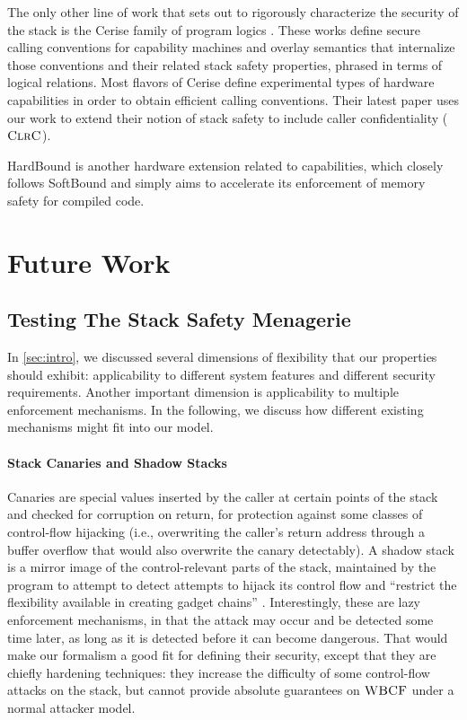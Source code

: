 \documentclass[10pt,conference]{ieeetran}%
\theoremstyle{definition}
\begin{document}
The only other line of work that sets out to rigorously characterize the
security of the stack is the Cerise family of program logics
\cite{SkorstengaardLocal, SkorstengaardSTKJFP, Georges22:TempsDesCerises}.
These works define secure calling conventions for capability machines and
overlay semantics that internalize those conventions and their related stack
safety properties, phrased in terms of logical relations. Most flavors of
Cerise define experimental types of hardware capabilities in order to obtain
efficient calling conventions. Their latest paper
\cite{Georges22:TempsDesCerises} uses our work to extend their notion of stack
safety to include caller confidentiality (\(\textnormal{\sc ClrC}\)).

HardBound \cite{DeviettiBMZ08} is another hardware extension related to
capabilities, which closely follows SoftBound \cite{NagarakatteZMZ09} and
simply aims to accelerate its enforcement of memory safety for compiled code.

\section{Future Work}
\label{sec:future}

\subsection{Testing The Stack Safety Menagerie}

In \cref{sec:intro}, we discussed several dimensions of flexibility
that our properties should exhibit: applicability to different system
features and different security requirements. Another important dimension
is applicability to multiple enforcement mechanisms.
In the following, we discuss how different existing mechanisms
might fit into our model.

\paragraph{Stack Canaries and Shadow Stacks}
%
Canaries are special values inserted by the caller at certain points of the
stack and checked for corruption on return, for protection against
some classes of control-flow hijacking (i.e., overwriting the caller's
return address through a buffer overflow that would also overwrite the canary
detectably). A shadow stack is a mirror image of the control-relevant parts of the stack,
maintained by the program to attempt to detect attempts to hijack its control
flow and ``restrict the flexibility available in creating gadget chains''
\cite{Shanbhogue+19}.
%
Interestingly, these are lazy enforcement mechanisms, in that
the attack may occur and be detected some time later, as long as
it is detected before it can become dangerous. That would make our
formalism a good fit for defining their security, except that
they are chiefly hardening techniques: they increase the difficulty
of some control-flow attacks on the stack, but cannot provide absolute
guarantees on \(\textnormal{\sc WBCF}\) under a normal attacker model.
\end{document}
